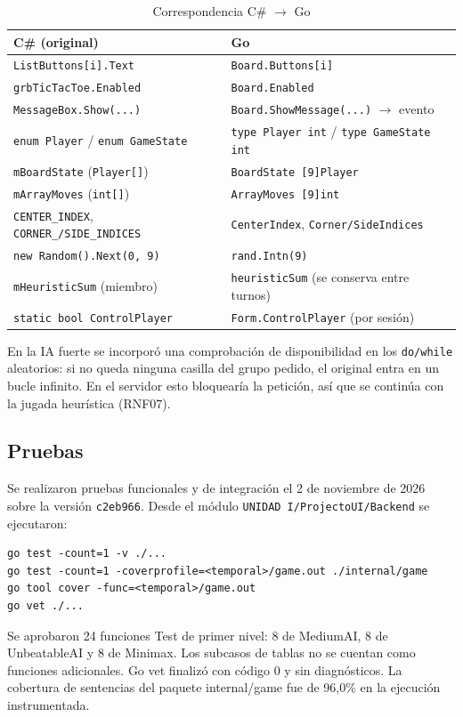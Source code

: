 \documentclass[12pt,a4paper]{article}
\begin{document}
\begin{table}[H]
\centering
\caption{Correspondencia C\# $\rightarrow$ Go}
\small
\begin{tabular}{ll}
\toprule
\textbf{C\# (original)} & \textbf{Go}\\
\midrule
\texttt{ListButtons[i].Text} & \texttt{Board.Buttons[i]}\\
\texttt{grbTicTacToe.Enabled} & \texttt{Board.Enabled}\\
\texttt{MessageBox.Show(...)} & \texttt{Board.ShowMessage(...)} $\rightarrow$ evento\\
\texttt{enum Player} / \texttt{enum GameState} & \texttt{type Player int} / \texttt{type GameState int}\\
\texttt{mBoardState} (\texttt{Player[]}) & \texttt{BoardState [9]Player}\\
\texttt{mArrayMoves} (\texttt{int[]}) & \texttt{ArrayMoves [9]int}\\
\texttt{CENTER\_INDEX}, \texttt{CORNER\_/SIDE\_INDICES} & \texttt{CenterIndex}, \texttt{Corner/SideIndices}\\
\texttt{new Random().Next(0, 9)} & \texttt{rand.Intn(9)}\\
\texttt{mHeuristicSum} (miembro) & \texttt{heuristicSum} (se conserva entre turnos)\\
\texttt{static bool ControlPlayer} & \texttt{Form.ControlPlayer} (por sesión)\\
\bottomrule
\end{tabular}
\end{table}

En la IA fuerte se incorporó una comprobación de disponibilidad en los \texttt{do/while}
aleatorios: si no queda ninguna casilla del grupo pedido, el original entra
en un bucle infinito. En el servidor esto bloquearía la petición, así que se
continúa con la jugada heurística (RNF07).

\subsection{Pruebas}
Se realizaron pruebas funcionales y de integración el 2 de noviembre de 2026
sobre la versión \texttt{c2eb966}. Desde el módulo
\texttt{UNIDAD I/ProjectoUI/Backend} se ejecutaron:
\begin{lstlisting}
go test -count=1 -v ./...
go test -count=1 -coverprofile=<temporal>/game.out ./internal/game
go tool cover -func=<temporal>/game.out
go vet ./...
\end{lstlisting}
Se aprobaron 24 funciones Test de primer nivel: 8 de MediumAI, 8 de UnbeatableAI y 8 de Minimax. Los subcasos de tablas no se cuentan como funciones adicionales. Go vet finaliz\'o con c\'odigo 0 y sin diagn\'osticos. La cobertura de sentencias del paquete internal/game fue de 96,0\% en la ejecuci\'on instrumentada.
\end{document}
